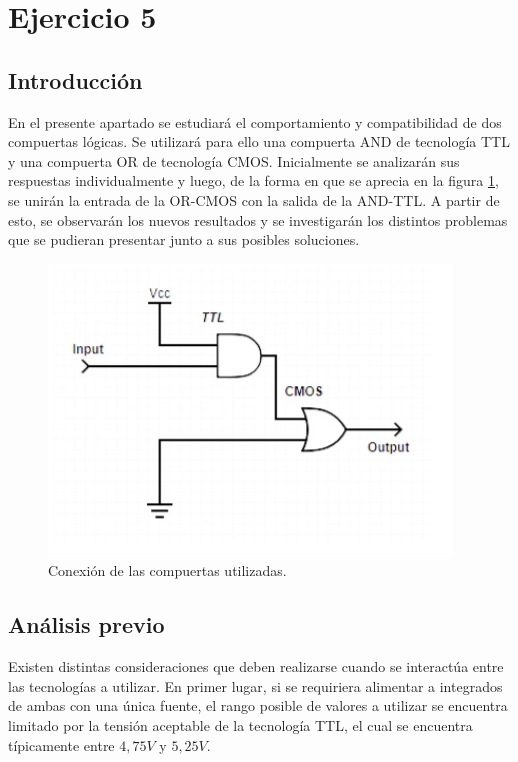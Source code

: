 \section{Ejercicio 5}
\subsection{Introducci\'on}
\noindent
En el presente apartado se estudiar\'a el comportamiento y compatibilidad de dos compuertas l\'ogicas. Se utilizar\'a para ello una compuerta AND de tecnolog\'ia TTL y una compuerta OR de tecnolog\'ia CMOS. Inicialmente se analizar\'an sus respuestas individualmente y luego, de la forma en que se aprecia en la figura \ref{ej5_fig:compuertasjuntas}, se unir\'an la entrada de la OR-CMOS con la salida de la AND-TTL. A partir de esto, se observar\'an los nuevos resultados y se investigar\'an los distintos problemas que se pudieran presentar junto a sus posibles soluciones.

\begin{figure}[H]
    \centering
    \includegraphics[scale=0.6]{figs/ej5/compuertas_juntas.png}
    \caption{Conexi\'on de las compuertas utilizadas.}
    \label{ej5_fig:compuertasjuntas}
\end{figure}

\subsection{An\'alisis previo}

\noindent
 Existen distintas consideraciones que deben realizarse cuando se interact\'ua entre las tecnolog\'ias a utilizar. En primer lugar, si se requiriera alimentar a integrados de ambas con una \'unica fuente, el rango posible de valores a utilizar se encuentra limitado por la tensi\'on aceptable de la tecnolog\'ia TTL, el cual se encuentra t\'ipicamente entre $4,75V$ y $5,25V$. 
 
